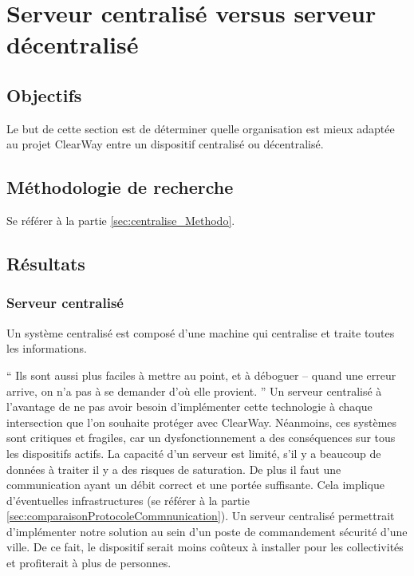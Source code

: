 
\section{Serveur centralisé versus serveur décentralisé}
\label{sec:centralise}

\subsection{Objectifs}
\label{sec:centralise_Objectifs}
Le but de cette section est de déterminer quelle organisation est mieux adaptée au projet ClearWay entre un dispositif centralisé ou décentralisé.

\subsection{Méthodologie de recherche}
\label{sec:centraliseMethodo}
Se référer à la partie \ref{sec:centralise_Methodo}.

\subsection{Résultats}
\label{sec:centralise_Resultats}

\subsubsection{Serveur centralisé}
\label{sec:centralise_centralise}
Un système centralisé est composé d'une machine qui centralise et traite toutes les informations.

\enquote{
    Ils sont aussi plus faciles à mettre au point, et à déboguer – quand une erreur arrive, on n’a pas à se demander d’où elle provient. \cite{centraliser}
}
Un serveur centralisé à l'avantage de ne pas avoir besoin d'implémenter cette technologie à chaque intersection que l'on souhaite protéger avec ClearWay.
Néanmoins, ces systèmes sont critiques et fragiles, car un dysfonctionnement a des conséquences sur tous les dispositifs actifs.
La capacité d'un serveur est limité, s'il y a beaucoup de données à traiter il y a des risques de saturation.
De plus il faut une communication ayant un débit correct et une portée suffisante. Cela implique d'éventuelles infrastructures (se référer à la partie \ref{sec:comparaisonProtocoleCommnunication}).
Un serveur centralisé permettrait d'implémenter notre solution au sein d'un poste de commandement sécurité d'une ville. De ce fait,
le dispositif serait moins coûteux à installer pour les collectivités et profiterait à plus de personnes.


